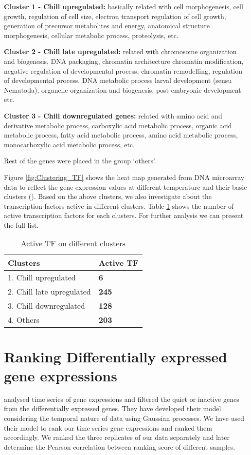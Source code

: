 \textbf{Cluster 1 - Chill upregulated:} basically related with cell morphogenesis, cell growth, regulation of cell size, electron transport regulation of cell growth, generation of precursor metabolites and energy, anatomical structure morphogenesis, cellular metabolic process, proteolysis, etc.

\textbf{Cluster 2 - Chill late upregulated:} related with chromosome organization and biogenesis, DNA packaging, chromatin architecture chromatin modification, negative regulation of developmental process, chromatin remodelling, regulation of developmental process, DNA metabolic process larval development (sensu Nematoda), organelle organization and biogenesis, post-embryonic development etc.

\textbf{Cluster 3 - Chill downregulated genes:} related with amino acid and derivative metabolic process, carboxylic acid metabolic process, organic acid metabolic process, fatty acid metabolic process, amino acid metabolic process, monocarboxylic acid metabolic process, etc.  

Rest of the genes were placed in the group \lq others\rq. 

Figure \ref{fig:Clustering_TF} shows the heat map generated from DNA microarray data to reflect the gene expression values at different temperature and their basic clusters (\cite{Cossins:2007}). Based on the above clusters, we also investigate about the transcription factors active in different clusters. Table \ref{table:Active_TF_diff_clusters} shows the number of active transcription factors for each clusters. For further analysis we can present the full list.

\begin{table}
	\centering
  \begin{tabular}{l l }
    \toprule
    \textbf{Clusters} & \textbf{Active TF} \\
    \midrule
    1. Chill upregulated & \bf 6 \\ 
    2. Chill late upregulated & \bf245 \\ 
    3. Chill downregulated & \bf128 \\
    4. Others & \bf 203 \\
  \bottomrule
  \end{tabular}
  \caption[Active TF on different clusters]
	  {Active TF on different clusters}
  \label{table:Active_TF_diff_clusters}
\end{table}

\section{Ranking Differentially expressed gene expressions}
\cite{Kalaitzis:2011} analysed time series of gene expressions and filtered the quiet or inactive genes from the differentially expressed genes. They have developed their model considering the temporal nature of data using Gaussian processes. We have used their model to rank our time series gene expressions and ranked them accordingly. We ranked the three replicates of our data separately and later determine the Pearson correlation between ranking score of different samples.

